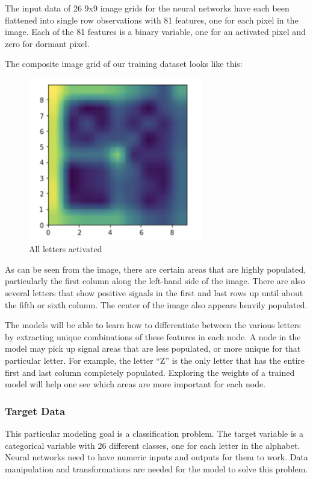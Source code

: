 \documentclass[5p,authoryear]{elsarticle}
\begin{document}
The input data of 26 9x9 image grids for the neural networks have each been flattened into single row observations with 81 features, one for each pixel in the image. 
Each of the 81 features is a binary variable, one for an activated pixel and zero for dormant pixel. 

The composite image grid of our training dataset looks like this:

\begin{figure}[!htb] \centering
	\includegraphics[width=3in]{figures/All Letters.png}
	\caption[]{All letters activated} 
	\label{abc} 
\end{figure}


As can be seen from the image, there are certain areas that are highly populated, particularly the first column along the left-hand side of the image. 
There are also several letters that show positive signals in the first and last rows up until about the fifth or sixth column. 
The center of the image also appears heavily populated. 

The models will be able to learn how to differentiate between the various letters by extracting unique combinations of these features in each node. 
A node in the model may pick up signal areas that are less populated, or more unique for that particular letter. 
For example, the letter “Z” is the only letter that has the entire first and last column completely populated. 
Exploring the weights of a trained model will help one see which areas are more important for each node. 


\subsubsection{Target Data}\label{input}

This particular modeling goal is a classification problem. 
The target variable is a categorical variable with 26 different classes, one for each letter in the alphabet. 
Neural networks need to have numeric inputs and outputs for them to work. 
Data manipulation and transformations are needed for the model to solve this problem.
\end{document}
